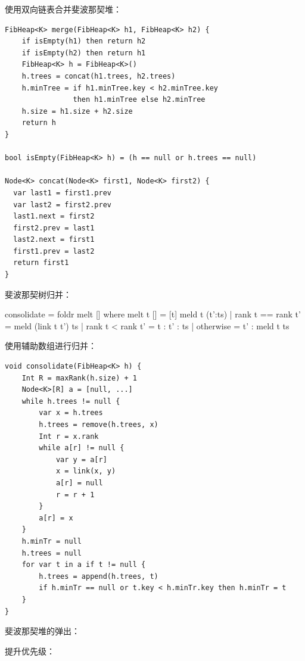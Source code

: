 \documentclass[b5paper]{ctexart}
\begin{document}
使用双向链表合并斐波那契堆：

\begin{lstlisting}[language = Bourbaki]
FibHeap<K> merge(FibHeap<K> h1, FibHeap<K> h2) {
    if isEmpty(h1) then return h2
    if isEmpty(h2) then return h1
    FibHeap<K> h = FibHeap<K>()
    h.trees = concat(h1.trees, h2.trees)
    h.minTree = if h1.minTree.key < h2.minTree.key
                then h1.minTree else h2.minTree
    h.size = h1.size + h2.size
    return h
}

bool isEmpty(FibHeap<K> h) = (h == null or h.trees == null)

Node<K> concat(Node<K> first1, Node<K> first2) {
  var last1 = first1.prev
  var last2 = first2.prev
  last1.next = first2
  first2.prev = last1
  last2.next = first1
  first1.prev = last2
  return first1
}
\end{lstlisting}

斐波那契树归并：

\begin{Haskell}
consolidate = foldr melt [] where
    melt t [] = [t]
    meld t (t':ts) | rank t == rank t' = meld (link t t') ts
                   | rank t <  rank t' = t : t' : ts
                   | otherwise = t' : meld t ts
\end{Haskell}

使用辅助数组进行归并：

\begin{lstlisting}[language = Bourbaki]
void consolidate(FibHeap<K> h) {
    Int R = maxRank(h.size) + 1
    Node<K>[R] a = [null, ...]
    while h.trees != null {
        var x = h.trees
        h.trees = remove(h.trees, x)
        Int r = x.rank
        while a[r] != null {
            var y = a[r]
            x = link(x, y)
            a[r] = null
            r = r + 1
        }
        a[r] = x
    }
    h.minTr = null
    h.trees = null
    for var t in a if t != null {
        h.trees = append(h.trees, t)
        if h.minTr == null or t.key < h.minTr.key then h.minTr = t
    }
}
\end{lstlisting}

斐波那契堆的弹出：


提升优先级：
\end{document}
